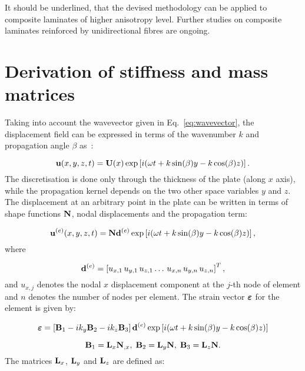 	It should be underlined, that the devised methodology can be applied to composite laminates of higher anisotropy level. Further studies on composite laminates reinforced by unidirectional fibres are ongoing.
	 
			\appendix
	 
\section{Derivation of stiffness and mass matrices}
	 Taking into account the wavevector given in Eq.~\ref{eq:wavevector}, the 
	 displacement field can be expressed in terms of the wavenumber \(k\) and 
	 propagation angle \(\beta\) as~\cite{Taupin2011}:
	  
\begin{equation}
	 \mathbf{u}(x,y,z,t) = \mathbf{U}(x) \exp \left[ i (\omega t + k \sin (\beta) y - k \cos (\beta) z)\right].
	 \end{equation}
	 The discretisation is done only through the thickness of the plate (along \(x\) axis), 
	 while the propagation kernel depends on the two other space variables \(y\) and \(z\). 
	 The displacement at an arbitrary point in the plate can be written in terms of shape 
	 functions \( \mathbf{N}\), nodal displacements   and the propagation term:
	 
\begin{equation}
	 \mathbf{u}^{(e)}(x,y,z,t) = \mathbf{N} \mathbf{d}^{(e)} \exp \left[ i (\omega t + k \sin (\beta) y - k \cos (\beta) z)\right],
	 \end{equation}
	 where
	 
\begin{equation}
	 \mathbf{d}^{(e)} =  \left[ u_{x,1} \, u_{y,1} \, u_{z,1} \ldots  \, u_{x,n} \, u_{y,n} \, u_{z,n} \right]^T,
	 \end{equation}
	 and \(u_{x,j}\) denotes the nodal \(x\) displacement component at the \(j\)-th node of 
	 element and \(n\) denotes the number of nodes per element.
	 The strain vector \(\boldsymbol{\varepsilon}\) for the element is given by:
	  
\begin{equation}
	 \boldsymbol{\varepsilon}= \left[ \mathbf{B}_1 -i k_y \mathbf{B}_2 -i k_z \mathbf{B}_3 \right] \mathbf{d}^{(e)} \exp \left[ i (\omega t + k \sin (\beta) y - k \cos (\beta) z)\right]
	 \end{equation}
	  
\begin{equation}
	 \mathbf{B}_1= \mathbf{L}_x \mathbf{N}_{,x},\; \mathbf{B}_2= \mathbf{L}_y \mathbf{N},\; \mathbf{B}_3= \mathbf{L}_z \mathbf{N}.
	 \end{equation}
	 The matrices \( \mathbf{L}_x \),  \( \mathbf{L}_y \) and  \( \mathbf{L}_z \) are defined as:
	 

